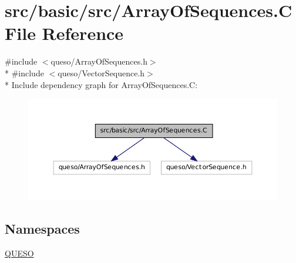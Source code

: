 \hypertarget{_array_of_sequences_8_c}{\section{src/basic/src/\-Array\-Of\-Sequences.C File Reference}
\label{_array_of_sequences_8_c}
}
{\ttfamily \#include $<$queso/\-Array\-Of\-Sequences.\-h$>$}\\*
{\ttfamily \#include $<$queso/\-Vector\-Sequence.\-h$>$}\\*
Include dependency graph for Array\-Of\-Sequences.\-C\-:
\nopagebreak
\begin{figure}[H]
\begin{center}
\leavevmode
\includegraphics[width=350pt]{_array_of_sequences_8_c__incl}
\end{center}
\end{figure}
\subsection*{Namespaces}
\begin{DoxyCompactItemize}
\item 
\hyperlink{namespace_q_u_e_s_o}{Q\-U\-E\-S\-O}
\end{DoxyCompactItemize}
